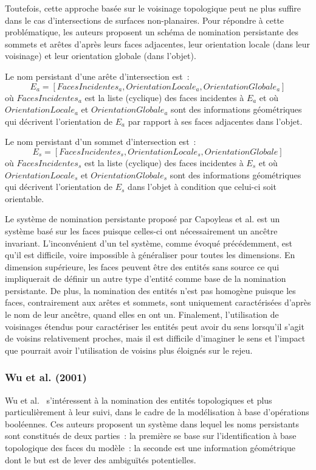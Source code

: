 Toutefois, cette approche basée sur le voisinage topologique peut ne plus
suffire dans le cas d'intersections de surfaces non-planaires. %
Pour répondre à cette problématique, les auteurs proposent un schéma de
nomination persistante des sommets et arêtes d'après leurs faces adjacentes,
leur orientation locale (dans leur voisinage) et leur orientation globale (dans
l'objet). %

Le nom persistant d'une arête d'intersection est~:
\[E_{a} = [FacesIncidentes_{a}, OrientationLocale_{a}, OrientationGlobale_{a}]\]
où \(FacesIncidentes_{a}\) est la liste (cyclique) des faces incidentes à
\(E_{a}\) et où \(OrientationLocale_{a}\) et \(OrientationGlobale_{a}\) sont des
informations géométriques qui décrivent l'orientation de \(E_{a}\) par rapport à
ses faces adjacentes dans l'objet.

Le nom persistant d'un sommet d'intersection est~: %
\[E_{s} = [FacesIncidentes_{s},OrientationLocale_{s},OrientationGlobale]\] %
où \(\mathit{FacesIncidentes_{s}}\) est la liste (cyclique) des faces incidentes
à \(E_{s}\) et où \(\mathit{OrientationLocale_{s}}\) et
\(\mathit{OrientationGlobale_{s}}\) sont des informations géométriques qui
décrivent l'orientation de \(E_{s}\) dans l'objet à condition que celui-ci soit
orientable. %

Le système de nomination persistante proposé par Capoyleas et al. est un système
basé sur les faces puisque celles-ci ont nécessairement un ancêtre invariant. %
L'inconvénient d'un tel système, comme évoqué précédemment, est qu'il est
difficile, voire impossible à généraliser pour toutes les dimensions. %
En dimension supérieure, les faces peuvent être des entités sans source ce qui
impliquerait de définir un autre type d'entité comme base de la nomination
persistante. %
De plus, la nomination des entités n'est pas homogène puisque les faces,
contrairement aux arêtes et sommets, sont uniquement caractérisées d'après le
nom de leur ancêtre, quand elles en ont un. %
Finalement, l'utilisation de voisinages étendus pour caractériser les entités
peut avoir du sens lorsqu'il s'agit de voisins relativement proches, mais il est
difficile d'imaginer le sens et l'impact que pourrait avoir l'utilisation de
voisins plus éloignés sur le rejeu. %

\subsubsection*{Wu et al. (2001) }


Wu et al.~\cite{wu2001face} s'intéressent à la nomination des entités
topologiques et plus particulièrement à leur suivi, dans le cadre de la modélisation
à base d'opérations booléennes. %
Ces auteurs proposent un système dans lequel
les noms persistants sont constitués de deux parties~: la première se base sur
l'identification à base topologique des faces du modèle~: la seconde est une information géométrique
dont le but est de lever des ambiguïtés potentielles. %

